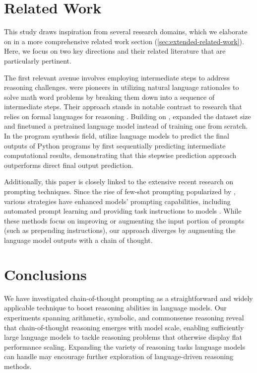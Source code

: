 \section{Related Work} This study draws inspiration from several research domains, which we elaborate on in a more comprehensive related work section (\cref{sec:extended-related-work}). Here, we focus on two key directions and their related literature that are particularly pertinent.

The first relevant avenue involves employing intermediate steps to address reasoning challenges. \cite{ling-etal-2017-program} were pioneers in utilizing natural language rationales to solve math word problems by breaking them down into a sequence of intermediate steps. Their approach stands in notable contrast to research that relies on formal languages for reasoning \citep{roy-2016-reasoning, chiang-chen-2019-semantically, amini-etal-2019-mathqa, chen2019neural}. Building on \citet{ling-etal-2017-program}, \citet{cobbe2021training} expanded the dataset size and finetuned a pretrained language model instead of training one from scratch. In the program synthesis field, \cite{nye2021show} utilize language models to predict the final outputs of Python programs by first sequentially predicting intermediate computational results, demonstrating that this stepwise prediction approach outperforms direct final output prediction.

Additionally, this paper is closely linked to the extensive recent research on prompting techniques. Since the rise of few-shot prompting popularized by \citet{brown2020language}, various strategies have enhanced models' prompting capabilities, including automated prompt learning \citep{lester-etal-2021-power} and providing task instructions to models \citep{wei2021finetuned,sanh2021multitask,ouyang2022training}. While these methods focus on improving or augmenting the input portion of prompts (such as prepending instructions), our approach diverges by augmenting the language model outputs with a chain of thought.

\section{Conclusions} We have investigated chain-of-thought prompting as a straightforward and widely applicable technique to boost reasoning abilities in language models. Our experiments spanning arithmetic, symbolic, and commonsense reasoning reveal that chain-of-thought reasoning emerges with model scale, enabling sufficiently large language models to tackle reasoning problems that otherwise display flat performance scaling. Expanding the variety of reasoning tasks language models can handle may encourage further exploration of language-driven reasoning methods.

